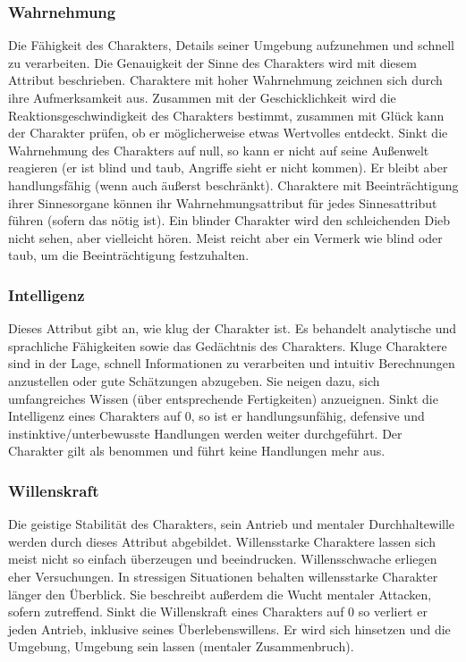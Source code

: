 \documentclass{article}
\begin{document}
\subsubsection{Wahrnehmung}

Die Fähigkeit des Charakters, Details seiner Umgebung aufzunehmen und schnell zu verarbeiten. Die Genauigkeit der
Sinne des Charakters wird mit diesem Attribut beschrieben. Charaktere mit hoher Wahrnehmung zeichnen sich durch
ihre Aufmerksamkeit aus. Zusammen mit der Geschicklichkeit wird die Reaktionsgeschwindigkeit des Charakters bestimmt,
zusammen mit Glück kann der Charakter prüfen, ob er möglicherweise etwas Wertvolles entdeckt. Sinkt die Wahrnehmung des
Charakters auf null, so kann er nicht auf seine Außenwelt reagieren (er ist blind und taub, Angriffe sieht er nicht
kommen). Er bleibt aber handlungsfähig (wenn auch äußerst beschränkt). Charaktere mit Beeinträchtigung ihrer
Sinnesorgane können ihr Wahrnehmungsattribut für jedes Sinnesattribut führen (sofern das nötig ist). Ein blinder
Charakter wird den schleichenden Dieb nicht sehen, aber vielleicht hören. Meist reicht aber ein Vermerk wie blind
oder taub, um die Beeinträchtigung festzuhalten.

\subsubsection{Intelligenz}

Dieses Attribut gibt an, wie klug der Charakter ist. Es behandelt analytische und sprachliche Fähigkeiten sowie das
Gedächtnis des Charakters. Kluge Charaktere sind in der Lage, schnell Informationen zu verarbeiten und intuitiv
Berechnungen anzustellen oder gute Schätzungen abzugeben. Sie neigen dazu, sich umfangreiches Wissen (über entsprechende
Fertigkeiten) anzueignen. Sinkt die Intelligenz eines Charakters auf 0, so ist er handlungsunfähig, defensive und
instinktive/unterbewusste Handlungen werden weiter durchgeführt. Der Charakter gilt als benommen und führt keine
Handlungen mehr aus.

\subsubsection{Willenskraft}

Die geistige Stabilität des Charakters, sein Antrieb und mentaler Durchhaltewille werden durch dieses Attribut
abgebildet. Willensstarke Charaktere lassen sich meist nicht so einfach überzeugen und beeindrucken. Willensschwache
erliegen eher Versuchungen. In stressigen Situationen behalten willensstarke Charakter länger den Überblick. Sie
beschreibt außerdem die Wucht mentaler Attacken, sofern zutreffend. Sinkt die Willenskraft eines Charakters auf 0
so verliert er jeden Antrieb, inklusive seines Überlebenswillens. Er wird sich hinsetzen und die Umgebung, Umgebung
sein lassen (mentaler Zusammenbruch).
\end{document}
